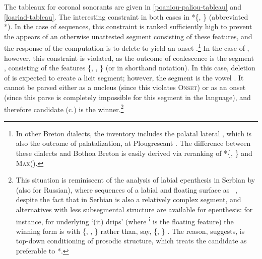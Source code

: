 The tableaux for coronal sonorants are given in \ref{poaniou-paliou-tableau} and \ref{loariad-tableau}. The interesting constraint in both cases in *\{, \} (abbreviated *). In the case of  sequences, this constraint is ranked sufficiently high to prevent the appears of an otherwise unattested segment consisting of these features, and the response of the computation is to delete  to yield an onset \ipa{[i]}.\footnote{In other Breton dialects, the inventory includes the palatal lateral \ipa{[ʎ]}, which is also the outcome of palatalization, \eg at Plougrescant \citep{le78:_le_ploug}. The difference between these dialects and Bothoa Breton is easily derived via reranking of *\{, \} and \textsc{Max}().} In the case of , however, this constraint is violated, as the outcome of coalescence is the segment , consisting of the features \{, , \} (or  in shorthand notation). In this case, deletion of  is expected to create a licit segment; however, the segment is the vowel \ipa{[e]}. It cannot be parsed either as a nucleus (since this violates \textsc{Onset}) or as an onset (since this parse is completely impossible for this segment in the language), and therefore candidate (c.) is the winner.\footnote{This situation is reminiscent of the analysis of labial epenthesis in Serbian by \citet{moren-serbian} (\cf also \citealt{iosad10:_palatalization} for Russian), where sequences of a labial and floating  surface as \eg\ \ipa{[pʎ]}, despite the fact that \ipa{[ʎ]} in Serbian is also a relatively complex segment, and alternatives with less subsegmental structure are available for epenthesis: for instance, for underlying  `(it) drips' (where \textsuperscript{i} is the floating feature) the winning form is \ipa{[ˈkapʎɛ]} with \{, , \} \ipa{[ʎ]} rather than, say, \{, \} \ipa{[ɛ]}. The reason, \citet{moren-serbian} suggests, is top-down conditioning of prosodic structure, which treats the candidate \ipa{[kapʎɛ]} as preferable to *\ipa{[kapɛɛ]}.}

